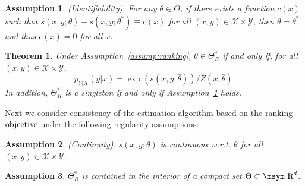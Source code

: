 \documentclass[11pt,a4paper]{article}
\newcommand{\reals}{\mbox{\msym R}}
\newcommand{\str}[3]{s(#1, #2; #3)}
\newtheorem{theorem}{Theorem}[section]
\newtheorem{assumption}{Assumption}[section]
\newcommand{\loss}{\hbox{objective}}
\begin{document}
\begin{assumption}
  (Identifiability). 
For any $\theta\in\Theta$, if there exists a function
$c(x)$ such that $\str{x}{y}{\theta} - \str{x}{y}{\theta^*} \equiv c(x)$
for all $ (x, y)\in\mathcal{X} \times \mathcal{Y}$, then $\theta = \theta^*$ and thus 
$c(x) = 0$ for all $x$.
  \label{assump:identifiability-rank}
\end{assumption}

\begin{theorem} 
Under Assumption~\ref{assump:ranking}, $\bar{\theta}\in\Theta_R^*$ if and only if, for all $ (x, y)\in\mathcal{X} \times \mathcal{Y}$,
\[
p_{Y|X}(y|x) = \exp(\str{x}{y}{\bar{\theta}})/Z(x, \bar{\theta} ).
\]
In addition, $\Theta_R^*$ is a singleton if and only if Assumption~\ref{assump:identifiability-rank} holds. 
\label{thm:pop-consistency-rank}
\end{theorem}



Next we consider consistency of the estimation algorithm based on the 
ranking $\loss$ under the following regularity assumptions:
\begin{assumption}
  (Continuity). $\str{x}{y}{\theta}$ is continuous w.r.t. $\theta$ for all $(x, y)\in\mathcal{X}\times \mathcal{Y}$.
  \label{assump:continuity}
\end{assumption}
\begin{assumption} 
$\Theta_R^*$ is contained in the interior of a compact set $\Theta\subset\reals^d$.
  \label{assump:compactness-rank}
\end{assumption}
\end{document}
